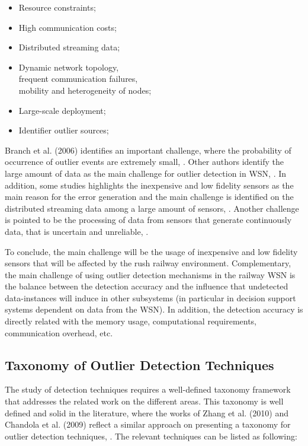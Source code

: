 \begin{itemize}
	\setlength\itemsep{-0.5em}
	
	\item Resource constraints;
	
	\item High communication costs;
	
	\item Distributed streaming data;
	
	\item Dynamic network topology, \\ frequent communication failures, \\ mobility and heterogeneity of nodes;
	
	\item Large-scale deployment;
	
	\item Identifier outlier sources;
	
\end{itemize}

Branch et al. (2006)  identifies an important challenge, where the probability of occurrence of outlier events are extremely small, \cite{class:branch:2006}. Other authors identify the large amount of data as the main challenge for outlier detection in WSN, \cite{nn:abid:2016, stat:sheng:2007}. In addition, some studies highlights the inexpensive and low fidelity sensors as the main reason for the error generation and the main challenge is identified on the distributed streaming data among a large amount of sensors, \cite{nn:zhuang:2006}. Another challenge is pointed to be  the processing of data from sensors that generate continuously data, that is uncertain and unreliable, \cite{stat:ghorbel:2015}. 

To conclude, the main challenge will be the usage of inexpensive and low fidelity sensors that will be affected by the rush railway environment. Complementary, the main challenge of using outlier detection mechanisms in the railway \ac{WSN} is the balance between the detection accuracy and the influence that undetected data-instances will induce in other subsystems (in particular in decision support systems dependent on data from the \ac{WSN}). In addition, the detection accuracy is directly related with the memory usage, computational requirements, communication overhead, etc. 


\subsection{Taxonomy of Outlier Detection Techniques}
\label{sec:taxon}
The study of detection techniques requires a well-defined taxonomy framework that addresses the related work on the different areas. 
This taxonomy is well defined and solid in the literature, where the works of Zhang et al. (2010) and Chandola et al. (2009) reflect a similar approach on presenting a taxonomy for outlier detection techniques, \cite{gen:zhang:2010, gen:chandola:2009}. The relevant techniques can be listed as following: 

